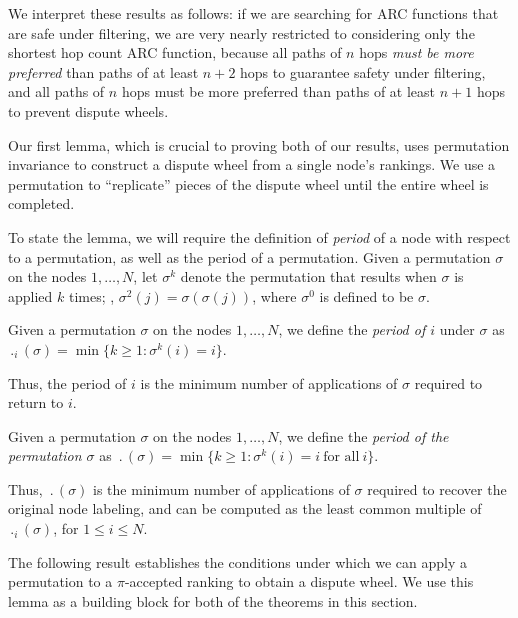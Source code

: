 We interpret these results as follows: if we are searching
for ARC functions that are safe under filtering, we are very nearly restricted
to considering only the shortest hop count ARC function, because all paths
of $n$ hops {\em must be more preferred} than paths of at least $n+2$
hops to guarantee safety under filtering, and all paths of $n$ hops must be more
preferred than paths of at least $n+1$ hops to prevent dispute wheels.

Our first lemma, which is crucial to proving both of our results, uses
permutation invariance to construct a dispute
wheel from a single node's rankings.  We use a
permutation to ``replicate'' pieces of the dispute wheel until
the entire wheel is completed.

To state the lemma, we will require the definition of {\em period} of
a node with respect to a permutation, as well as the period of a
permutation.  Given a permutation $\sigma$ on the nodes $1, \ldots,
N$, let $\sigma^k$ denote the permutation that results when $\sigma$ is
applied $k$ times; \eg, $\sigma^2(j) = \sigma(\sigma(j))$, where
$\sigma^0$ is defined to be $\sigma$.

\begin{defn}[Period]
Given a permutation $\sigma$ on the nodes $1, \ldots, N$, we define
the {\em period of $i$} under $\sigma$ as $\period_i(\sigma) = \min
\{k \geq 1 : \sigma^k(i) = i \}$.

Thus, the period of $i$ is the minimum number of applications of
$\sigma$ required to return to $i$.
\end{defn}

\begin{defn}
Given a permutation $\sigma$ on the nodes $1, \ldots, N$, we define
the {\em period of the permutation $\sigma$} as $\period(\sigma) = \min \{ k \geq 1 : \sigma^k(i) = i\ \text{for
all}\ i \}$.

Thus, $\period(\sigma)$ is the minimum number of
applications of $\sigma$ required to recover the original node
labeling, and can be computed as the least common multiple
of $\period_i(\sigma)$, for $1 \leq i \leq N$.
\end{defn}

The following result establishes the conditions under which we can apply
a permutation to a $\pi$-accepted ranking to obtain a
dispute wheel.  We use this lemma as a building block for both of
the theorems in this section.

